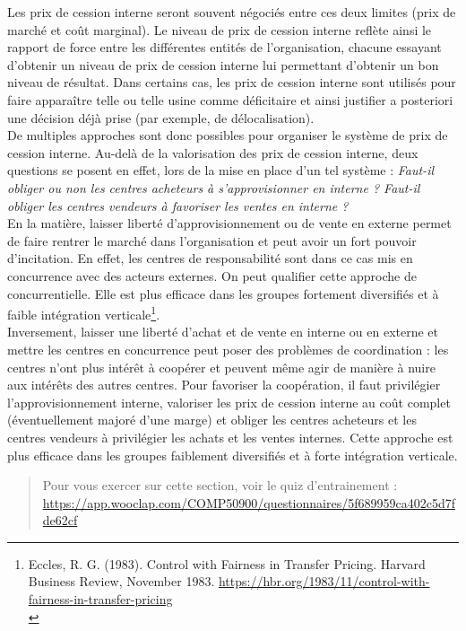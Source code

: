 \documentclass{tufte-handout}
\begin{document}
Les prix de cession interne seront souvent négociés entre ces deux limites (prix de marché et coût marginal). Le niveau de prix de cession interne reflète ainsi le rapport de force entre les différentes entités de l’organisation, chacune essayant d’obtenir un niveau de prix de cession interne lui permettant d’obtenir un bon niveau de résultat. Dans certains cas, les prix de cession interne sont utilisés pour faire apparaître telle ou telle usine comme déficitaire et ainsi justifier a posteriori une décision déjà prise (par exemple, de délocalisation).\\

De multiples approches sont donc possibles pour organiser le système de prix de cession interne. Au-delà de la valorisation des prix de cession interne, deux questions se posent en effet, lors de la mise en place d’un tel système : \emph{Faut-il obliger ou non les centres acheteurs à s’approvisionner en interne ? Faut-il obliger les centres vendeurs à favoriser les ventes en interne ?}\\
En la matière, laisser liberté d’approvisionnement ou de vente en externe permet de faire rentrer le marché dans l’organisation et peut avoir un fort pouvoir d’incitation. En effet, les centres de responsabilité sont dans ce cas mis en concurrence avec des acteurs externes. On peut qualifier cette approche de concurrentielle. Elle est plus efficace dans les groupes fortement diversifiés et à faible intégration verticale\footnote{Eccles, R. G. (1983). Control with Fairness in Transfer Pricing. Harvard Business Review, November 1983. \url{https://hbr.org/1983/11/control-with-fairness-in-transfer-pricing}\\}.\\
Inversement, laisser une liberté d’achat et de vente en interne ou en externe et mettre les centres en concurrence peut poser des problèmes de coordination : les centres n’ont plus intérêt à coopérer et peuvent même agir de manière à nuire aux intérêts des autres centres. Pour favoriser la coopération, il faut privilégier l’approvisionnement interne, valoriser les prix de cession interne au coût complet (éventuellement majoré d'une marge) et obliger les centres acheteurs et les centres vendeurs à privilégier les achats et les ventes internes. Cette approche est plus efficace dans les groupes faiblement diversifiés et à forte intégration verticale.\\

\begin{quote}
Pour vous exercer sur cette section, voir le quiz d'entrainement : \url{https://app.wooclap.com/COMP50900/questionnaires/5f689959ca402c5d7fde62cf}\\
\end{quote}
\end{document}
